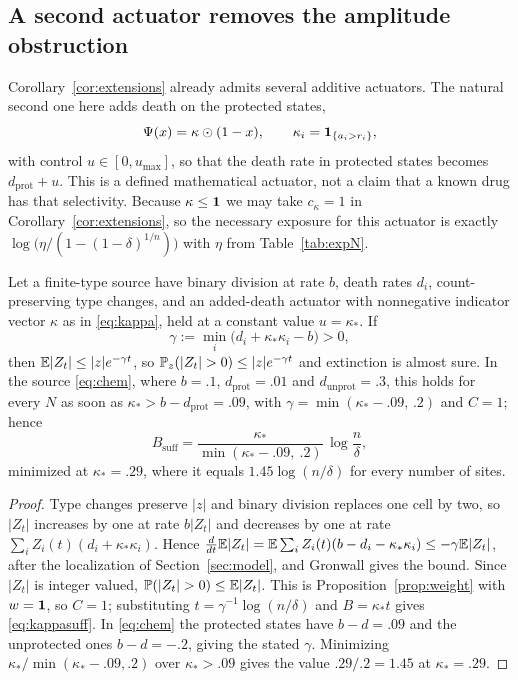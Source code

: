 \subsection{A second actuator removes the amplitude obstruction}
\label{sec:combo}

Corollary~\ref{cor:extensions} already admits several additive actuators. The
natural second one here adds death on the protected states,
\begin{equation}\label{eq:kappa}
 \Psi(x)=\kappa\odot(1-x),\qquad
 \kappa_i=\mathbf1_{\{a_i>r_i\}},
\end{equation}
with control $u\in[0,u_{\max}]$, so that the death rate in protected states
becomes $d_{\mathrm{prot}}+u$. This is a defined mathematical actuator, not a
claim that a known drug has that selectivity. Because $\kappa\le\mathbf1$ we may
take $c_\kappa=1$ in Corollary~\ref{cor:extensions}, so the necessary exposure
for this actuator is exactly $\log\bigl(\eta/(1-(1-\delta)^{1/n})\bigr)$ with
$\eta$ from Table~\ref{tab:expN}.

\begin{proposition}\label{prop:kappa}
Let a finite-type source have binary division at rate $b$, death rates $d_i$,
count-preserving type changes, and an added-death actuator with nonnegative
indicator vector $\kappa$ as in \eqref{eq:kappa}, held at a constant value
$u=\kappa_*$. If
\[
 \gamma:=\min_i\bigl(d_i+\kappa_*\kappa_i-b\bigr)>0 ,
\]
then $\mathbb E|Z_t|\le|z|e^{-\gamma t}$, so $\Prob_z(|Z_t|>0)\le|z|e^{-\gamma t}$ and
extinction is almost sure. In the source \eqref{eq:chem}, where
$b=.1$, $d_{\mathrm{prot}}=.01$ and $d_{\mathrm{unprot}}=.3$, this holds for
every $N$ as soon as $\kappa_*>b-d_{\mathrm{prot}}=.09$, with
$\gamma=\min(\kappa_*-.09,\,.2)$ and $C=1$; hence
\begin{equation}\label{eq:kappasuff}
 B_{\mathrm{suff}}=\frac{\kappa_*}{\min(\kappa_*-.09,\ .2)}\,\log\frac n\delta ,
\end{equation}
minimized at $\kappa_*=.29$, where it equals $1.45\log(n/\delta)$ for every
number of sites.
\end{proposition}

\begin{proof}
Type changes preserve $|z|$ and binary division replaces one cell by two, so
$|Z_t|$ increases by one at rate $b|Z_t|$ and decreases by one at rate
$\sum_iZ_i(t)(d_i+\kappa_*\kappa_i)$. Hence
$\frac{d}{dt}\mathbb E|Z_t|=\mathbb E\sum_iZ_i(t)(b-d_i-\kappa_*\kappa_i)\le-\gamma\mathbb E|Z_t|$,
after the localization of Section~\ref{sec:model}, and Gronwall gives the
bound. Since $|Z_t|$ is integer valued, $\Prob(|Z_t|>0)\le\E|Z_t|$. This is
Proposition~\ref{prop:weight} with $w=\mathbf1$, so $C=1$; substituting
$t=\gamma^{-1}\log(n/\delta)$ and $B=\kappa_*t$ gives \eqref{eq:kappasuff}. In
\eqref{eq:chem} the protected states have $b-d=.09$ and the unprotected ones
$b-d=-.2$, giving the stated $\gamma$. Minimizing $\kappa_*/\min(\kappa_*-.09,.2)$
over $\kappa_*>.09$ gives the value $.29/.2=1.45$ at $\kappa_*=.29$.
\end{proof}


